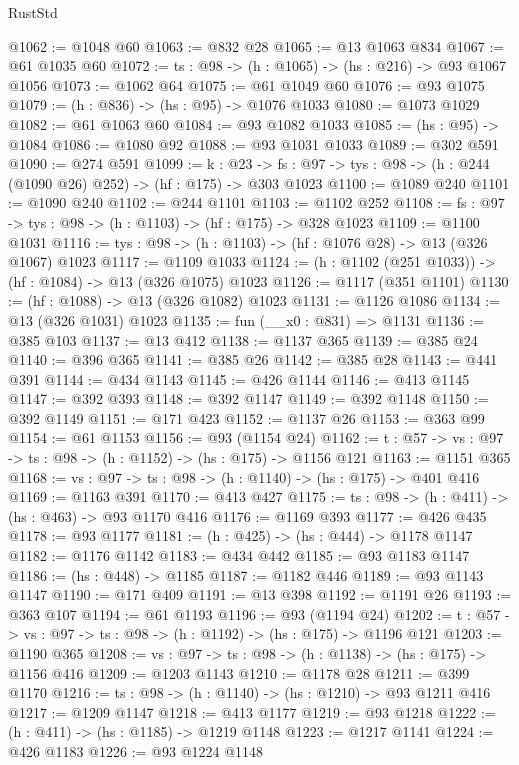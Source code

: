 \begin{lexlean}{RustStd}
\begin{coremodule}
@1062 := @1048 @60
@1063 := @832 @28
@1065 := @13 @1063 @834
@1067 := @61 @1035 @60
@1072 := {ts : @98} -> (h : @1065) -> (hs : @216) -> @93 @1067 @1056
@1073 := @1062 @64
@1075 := @61 @1049 @60
@1076 := @93 @1075
@1079 := (h : @836) -> (hs : @95) -> @1076 @1033
@1080 := @1073 @1029
@1082 := @61 @1063 @60
@1084 := @93 @1082 @1033
@1085 := (hs : @95) -> @1084
@1086 := @1080 @92
@1088 := @93 @1031 @1033
@1089 := @302 @591
@1090 := @274 @591
@1099 := {k : @23} ->
  {fs : @97} -> {tys : @98} -> (h : @244 (@1090 @26) @252) -> (hf : @175) -> @303 @1023
@1100 := @1089 @240
@1101 := @1090 @240
@1102 := @244 @1101
@1103 := @1102 @252
@1108 := {fs : @97} -> {tys : @98} -> (h : @1103) -> (hf : @175) -> @328 @1023
@1109 := @1100 @1031
@1116 := {tys : @98} -> (h : @1103) -> (hf : @1076 @28) -> @13 (@326 @1067) @1023
@1117 := @1109 @1033
@1124 := (h : @1102 (@251 @1033)) -> (hf : @1084) -> @13 (@326 @1075) @1023
@1126 := @1117 (@351 @1101)
@1130 := (hf : @1088) -> @13 (@326 @1082) @1023
@1131 := @1126 @1086
@1134 := @13 (@326 @1031) @1023
@1135 := fun (__x0 : @831) => @1131
@1136 := @385 @103
@1137 := @13 @412
@1138 := @1137 @365
@1139 := @385 @24
@1140 := @396 @365
@1141 := @385 @26
@1142 := @385 @28
@1143 := @441 @391
@1144 := @434 @1143
@1145 := @426 @1144
@1146 := @413 @1145
@1147 := @392 @393
@1148 := @392 @1147
@1149 := @392 @1148
@1150 := @392 @1149
@1151 := @171 @423
@1152 := @1137 @26
@1153 := @363 @99
@1154 := @61 @1153
@1156 := @93 (@1154 @24)
@1162 := {t : @57} -> {vs : @97} -> {ts : @98} -> (h : @1152) -> (hs : @175) -> @1156 @121
@1163 := @1151 @365
@1168 := {vs : @97} -> {ts : @98} -> (h : @1140) -> (hs : @175) -> @401 @416
@1169 := @1163 @391
@1170 := @413 @427
@1175 := {ts : @98} -> (h : @411) -> (hs : @463) -> @93 @1170 @416
@1176 := @1169 @393
@1177 := @426 @435
@1178 := @93 @1177
@1181 := (h : @425) -> (hs : @444) -> @1178 @1147
@1182 := @1176 @1142
@1183 := @434 @442
@1185 := @93 @1183 @1147
@1186 := (hs : @448) -> @1185
@1187 := @1182 @446
@1189 := @93 @1143 @1147
@1190 := @171 @409
@1191 := @13 @398
@1192 := @1191 @26
@1193 := @363 @107
@1194 := @61 @1193
@1196 := @93 (@1194 @24)
@1202 := {t : @57} -> {vs : @97} -> {ts : @98} -> (h : @1192) -> (hs : @175) -> @1196 @121
@1203 := @1190 @365
@1208 := {vs : @97} -> {ts : @98} -> (h : @1138) -> (hs : @175) -> @1156 @416
@1209 := @1203 @1143
@1210 := @1178 @28
@1211 := @399 @1170
@1216 := {ts : @98} -> (h : @1140) -> (hs : @1210) -> @93 @1211 @416
@1217 := @1209 @1147
@1218 := @413 @1177
@1219 := @93 @1218
@1222 := (h : @411) -> (hs : @1185) -> @1219 @1148
@1223 := @1217 @1141
@1224 := @426 @1183
@1226 := @93 @1224 @1148

\end{coremodule}
\end{lexlean}
